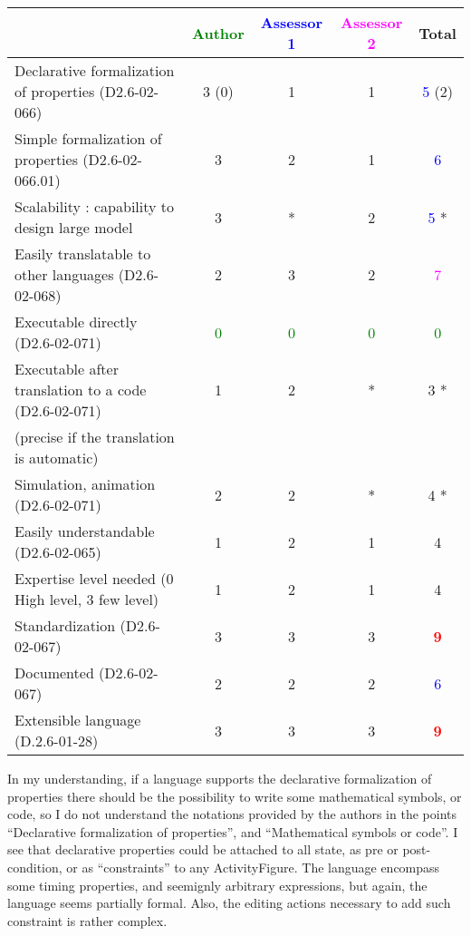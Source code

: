 \begin{tabular}{|l | c | c | c | c|}
\hline
& \textcolor{green}{Author} & \textcolor{blue}{Assessor 1} & \textcolor{magenta}{Assessor 2} & Total \\
\hline
Declarative formalization of properties (D2.6-02-066) & 3     (0) & 1     & 1     & \textcolor{blue}{5} (2) \\
\hline
Simple formalization of properties (D2.6-02-066.01) & 3     &  2 & 1     & \textcolor{blue}{6} \\
\hline
Scalability : capability to design large model & 3     & * & 2     & \textcolor{blue}{5} * \\
\hline
Easily translatable to other languages (D2.6-02-068) & 2     & 3     & 2     & \textcolor{magenta}{7} \\
\hline
Executable directly (D2.6-02-071) & \textcolor{green}{0} & \textcolor{green}{0} & \textcolor{green}{0} & \textcolor{green}{0} \\
\hline
Executable after translation to a code (D2.6-02-071) & 1     & 2     & * & 3    * \\
(precise if the translation is automatic) & & & & \\
\hline
Simulation, animation (D2.6-02-071) & 2     & 2     & * & 4    * \\
\hline
Easily understandable (D2.6-02-065) & 1     & 2     &  1 & 4     \\
\hline
Expertise level needed (0 High level, 3 few level) & 1     & 2     &  1 & 4     \\
\hline
Standardization (D2.6-02-067) & 3     & 3     & 3     & \textcolor{red}{\textbf{9}} \\
\hline
Documented (D2.6-02-067) & 2     & 2     & 2     & \textcolor{blue}{6} \\
\hline
Extensible language (D.2.6-01-28) & 3     & 3     & 3     & \textcolor{red}{\textbf{9}} \\
\hline
\end{tabular}

\begin{assessor1}
In my understanding, if a language supports the declarative formalization of properties there should be the possibility to write some mathematical symbols, or code, so I do not understand the notations provided by the authors in the points
"`Declarative formalization of properties"', and "`Mathematical symbols or code"'. I see that declarative properties could be attached to all state, as pre or post-condition, or as "`constraints"' to any ActivityFigure. The language encompass some timing properties, and seemignly arbitrary expressions, but again, the language seems partially formal. Also, the editing actions necessary to add such constraint is rather complex. 
\end{assessor1}


